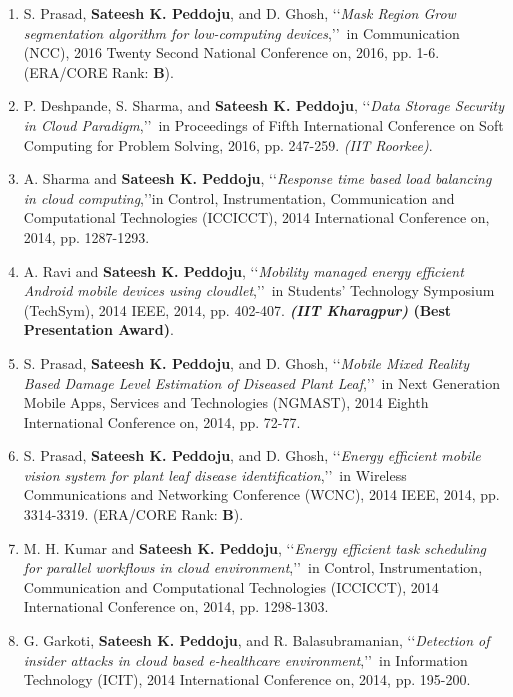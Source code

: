 \begin{enumerate}[label=(C\arabic*).]
	\item
	S. Prasad, \textbf{Sateesh K. Peddoju}, and D. Ghosh, \lq\lq \textit{Mask Region Grow segmentation algorithm for low-computing devices},\rq\rq\, in Communication (NCC), 2016 Twenty Second National Conference on, 2016, pp. 1-6. (ERA/CORE Rank: \textbf{B}).
	
	\item
	P. Deshpande, S. Sharma, and \textbf{Sateesh K. Peddoju}, \lq\lq \textit{Data Storage Security in Cloud Paradigm},\rq\rq\, in Proceedings of Fifth International Conference on Soft Computing for Problem Solving, 2016, pp. 247-259.  \textit{(IIT Roorkee)}.
	
	\item
	A. Sharma and \textbf{Sateesh K. Peddoju}, \lq\lq \textit{Response time based load balancing in cloud computing},\rq\rq in Control, Instrumentation, Communication and Computational Technologies (ICCICCT), 2014 International Conference on, 2014, pp. 1287-1293.
	
	\item
	A. Ravi and \textbf{Sateesh K. Peddoju}, \lq\lq \textit{Mobility managed energy efficient Android mobile devices using cloudlet},\rq\rq\, in Students' Technology Symposium (TechSym), 2014 IEEE, 2014, pp. 402-407.\textbf{ \textit{(IIT Kharagpur)} (Best Presentation Award)}.
	\item
	S. Prasad, \textbf{Sateesh K. Peddoju}, and D. Ghosh, \lq\lq \textit{Mobile Mixed Reality Based Damage Level Estimation of Diseased Plant Leaf},\rq\rq\, in Next Generation Mobile Apps, Services and Technologies (NGMAST), 2014 Eighth International Conference on, 2014, pp. 72-77.
	
	\item
	S. Prasad, \textbf{Sateesh K. Peddoju}, and D. Ghosh, \lq\lq \textit{Energy efficient mobile vision system for plant leaf disease identification},\rq\rq\, in Wireless Communications and Networking Conference (WCNC), 2014 IEEE, 2014, pp. 3314-3319. (ERA/CORE Rank: \textbf{B}).
	
	\item
	M. H. Kumar and \textbf{Sateesh K. Peddoju}, \lq\lq \textit{Energy efficient task scheduling for parallel workflows in cloud environment},\rq\rq\, in Control, Instrumentation, Communication and Computational Technologies (ICCICCT), 2014 International Conference on, 2014, pp. 1298-1303.
	
	\item
	G. Garkoti, \textbf{Sateesh K. Peddoju}, and R. Balasubramanian, \lq\lq \textit{Detection of insider attacks in cloud based e-healthcare environment},\rq\rq\, in Information Technology (ICIT), 2014 International Conference on, 2014, pp. 195-200.
	

\end{enumerate}
